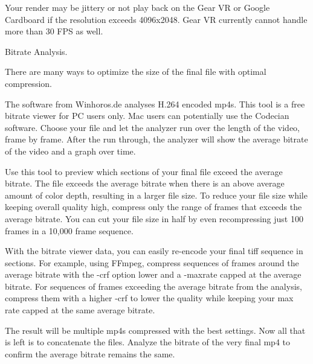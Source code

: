 \begin{fullwidth}
\tip Your render may be jittery or not play back on the Gear VR or Google Cardboard if the resolution exceeds 4096x2048. Gear VR currently cannot handle more than 30 FPS as well.

{\large Bitrate Analysis. \par}

There are many ways to optimize the size of the final file with optimal compression. 

The software from Winhoros.de analyses H.264 encoded mp4s. This tool is a free bitrate viewer for PC users only. Mac users can potentially use the Codecian software. Choose your file and let the analyzer run over the length of the video, frame by frame. After the run through, the analyzer will show the average bitrate of the video and a graph over time. 

Use this tool to preview which sections of your final file exceed the average bitrate. The file exceeds the average bitrate when there is an above average amount of color depth, resulting in a larger file size. To reduce your file size while keeping overall quality high, compress only the range of frames that exceeds the average bitrate. You can cut your file size in half by even recompressing just 100 frames in a 10,000 frame sequence.

With the bitrate viewer data, you can easily re-encode your final tiff sequence in sections. For example, using FFmpeg, compress sequences of frames around the average bitrate with the -crf option lower and a -maxrate capped at the average bitrate. For sequences of frames exceeding the average bitrate from the analysis, compress them with a higher -crf to lower the quality while keeping your max rate capped at the same average bitrate.

The result will be multiple mp4s compressed with the best settings. Now all that is left is to concatenate the files. Analyze the bitrate of the very final mp4 to confirm the average bitrate remains the same.


\clearpage
\end{fullwidth}